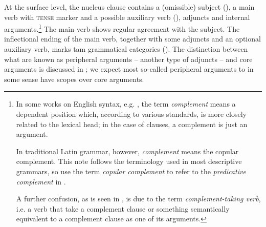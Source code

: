 \documentclass[a4paper, oneside, 12pt]{report}
\newcommand*{\term}[1]{\emph{#1}}
\newcommand*{\category}[1]{\textsc{#1}}
\begin{document}
At the surface level, the nucleus clause contains a (omissible) subject
(),
a main verb with \category{tense} marker and a possible auxiliary verb (),
adjuncts and internal arguments.\footnote{
    In some works on English syntax, e.g. \citet{cgel}, the term \term{complement} means a 
    dependent position which, according to various standards,
    is more closely related to the lexical head;
    in the case of clauses, a complement is just an argument.

    In traditional Latin grammar, however, \term{complement} means the copular complement. 
    This note follows the terminology used in most descriptive grammars,
    so use the term \term{copular complement} to refer to the \term{predicative complement} in \citet{cgel}.
    
    A further confusion, as is seen in , 
    is due to the term \term{complement-taking verb}, 
    i.e. a verb that take a complement clause 
    or something semantically equivalent to a complement clause
    as one of its arguments.
}
The main verb shows regular agreement with the subject.
The inflectional ending of the main verb, 
together with some adjuncts and an optional auxiliary verb,
marks \ac{tam} grammatical categories ().
The distinction between what are known as peripheral arguments
-- another type of adjuncts -- and core arguments
is discussed in ;
we expect most so-called peripheral arguments 
to in some sense have scopes over core arguments.
\end{document}
